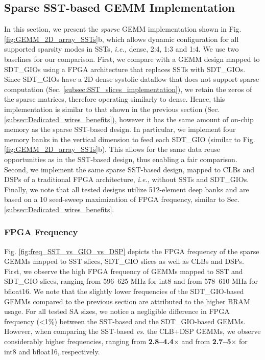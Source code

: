 



\subsection{Sparse SST-based GEMM Implementation}
\label{subsec:Sparse_GEMM_implementation}


In this section, we present the \textit{sparse} GEMM implementation shown in Fig. \ref{fig:GEMM_2D_array_SSTs}b, which allows dynamic configuration for all supported sparsity modes in SSTs, \emph{i.e.,} dense, 2:4, 1:3 and 1:4.
We use two baselines for our comparison.
First, we compare with a GEMM design mapped to SDT\_GIOs using a FPGA architecture that replaces SSTs with SDT\_GIOs. 
Since SDT\_GIOs have a 2D dense systolic dataflow that does not support sparse computation (Sec. \ref{subsec:SST_slices_implementation}), 
we retain the zeros of the sparse matrices, therefore operating similarly to dense. 
Hence, this implementation is similar to that shown in the previous section (Sec. \ref{subsec:Dedicated_wires_benefits}), however it has the same amount of on-chip memory as the sparse SST-based design. 
In particular, we implement four memory banks in the vertical dimension to feed each SDT\_GIO (similar to Fig. \ref{fig:GEMM_2D_array_SSTs}b).
This allows for the same data reuse opportunities as in the SST-based design, thus enabling a fair comparison.
Second, we implement the same sparse SST-based design, mapped to CLBs and DSPs of a traditional FPGA architecture, \emph{i.e.,} without SSTs and SDT\_GIOs.
Finally, we note that all tested designs utilize 512-element deep banks and are based on a 10 seed-sweep maximization of FPGA frequency, similar to Sec. \ref{subsec:Dedicated_wires_benefits}.





\subsubsection{FPGA Frequency}
Fig. \ref{fig:freq_SST_vs_GIO_vs_DSP} depicts the FPGA frequency of the sparse GEMMs mapped to SST slices, SDT\_GIO slices as well as CLBs and DSPs.
First, we observe the high FPGA frequency of GEMMs mapped to SST and SDT\_GIO slices, ranging from 596--625 MHz for int8 and from 578--610 MHz for bfloat16. 
We note that the slightly lower frequencies of the SDT\_GIO-based GEMMs compared to the previous section are attributed to the higher BRAM usage.
For all tested SA sizes, we notice a negligible difference in FPGA frequency (<1\%) between the SST-based and the SDT\_GIO-based GEMMs. 
However, when comparing the SST-based \emph{vs.} the CLB+DSP GEMMs, we observe considerably higher frequencies, ranging from \textbf{2.8--4.4$\times$} and from \textbf{2.7--5$\times$} for int8 and bfloat16, respectively.







